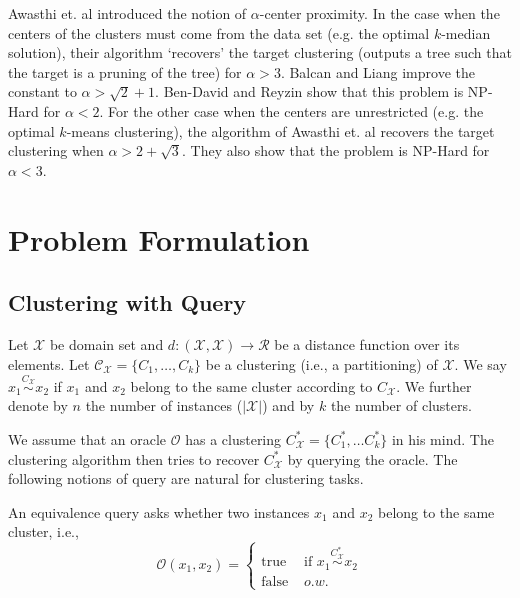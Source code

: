 \documentclass[orivec]{llncs}
\newcommand{\mc}{\mathcal}
\begin{document}
Awasthi et. al \cite{awasthi2012center} introduced the notion of $\alpha$-center proximity. In the case when the centers of the clusters must come from the data set (e.g. the optimal $k$-median solution), their algorithm `recovers' the target clustering (outputs a tree such that the target is a pruning of the tree) for $\alpha > 3$.  Balcan and Liang \cite{balcan2012clustering} improve the constant to $\alpha > \sqrt{2} + 1$. Ben-David and Reyzin \cite{ben2014data} show that this problem is NP-Hard for $\alpha < 2$. For the other case when the centers are unrestricted (e.g. the optimal $k$-means clustering), the algorithm of Awasthi et. al \cite{awasthi2012center} recovers the target clustering when $\alpha > 2+\sqrt{3}$. They also show that the problem is NP-Hard for $\alpha < 3$.

\section{Problem Formulation}



\subsection{Clustering with Query}

Let $\mc X$ be domain set and $d:(\mc X, \mc X) \rightarrow \mc R $ be a distance function over its elements. Let $\mc C_{\mc X} = \{C_1, \ldots, C_k\}$ be a clustering (i.e., a partitioning) of $\mc X$. We say $x_1 \overset{C_{\mc X}}{\sim} x_2$ if $x_1$ and $x_2$ belong to the same cluster according to $C_{\mc X}$. We further denote by $n$ the number of instances ($|{\mc X}|$) and by $k$ the number of clusters.

We assume that an oracle $\mc O$ has a clustering $C^*_{\mc X}=\{ C^*_1, \ldots C^*_k\}$ in his mind. The clustering algorithm then tries to recover $C^*_{\mc X}$ by querying the oracle. The following notions of query are natural for clustering tasks.

\begin{definition}
An equivalence query asks whether two instances $x_1$ and $x_2$ belong to the same cluster, i.e., 
$${\mc O}(x_1, x_2) = \left\{
	\begin{array}{ll}
		\mbox{true }  & \mbox{if } x_1 \overset{C^*_{\mc X}}{\sim} x_2   \\
		\mbox{false } & o.w. 
	\end{array}
\right. $$
\end{definition}
\end{document}
